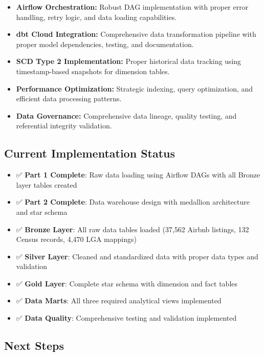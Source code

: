 \begin{itemize}
  \item \textbf{Airflow Orchestration:} Robust DAG implementation with proper error handling, retry logic, and data loading capabilities.
  
  \item \textbf{dbt Cloud Integration:} Comprehensive data transformation pipeline with proper model dependencies, testing, and documentation.
  
  \item \textbf{SCD Type 2 Implementation:} Proper historical data tracking using timestamp-based snapshots for dimension tables.
  
  \item \textbf{Performance Optimization:} Strategic indexing, query optimization, and efficient data processing patterns.
  
  \item \textbf{Data Governance:} Comprehensive data lineage, quality testing, and referential integrity validation.
\end{itemize}

\subsection{Current Implementation Status}

\begin{itemize}
  \item ✅ \textbf{Part 1 Complete}: Raw data loading using Airflow DAGs with all Bronze layer tables created
  \item ✅ \textbf{Part 2 Complete}: Data warehouse design with medallion architecture and star schema
  \item ✅ \textbf{Bronze Layer}: All raw data tables loaded (37,562 Airbnb listings, 132 Census records, 4,470 LGA mappings)
  \item ✅ \textbf{Silver Layer}: Cleaned and standardized data with proper data types and validation
  \item ✅ \textbf{Gold Layer}: Complete star schema with dimension and fact tables
  \item ✅ \textbf{Data Marts}: All three required analytical views implemented
  \item ✅ \textbf{Data Quality}: Comprehensive testing and validation implemented
\end{itemize}

\subsection{Next Steps}

